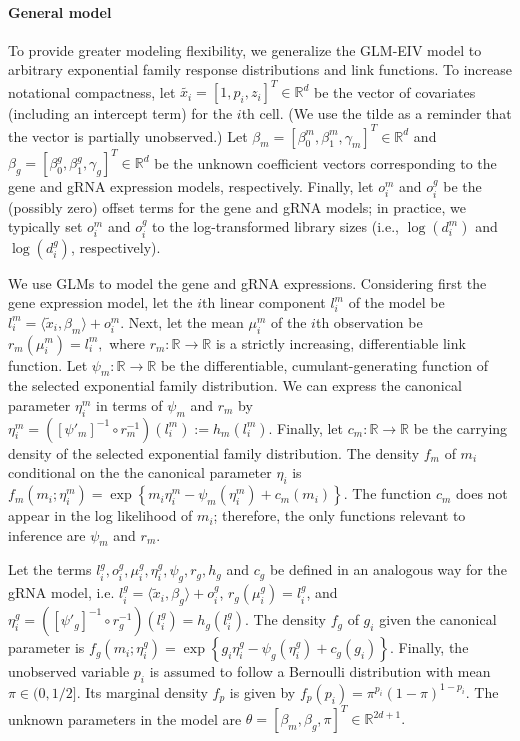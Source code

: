 \documentclass[12pt]{article}
\begin{document}
\paragraph{General model} To provide greater modeling flexibility, we generalize the GLM-EIV model to arbitrary exponential family response distributions and link functions. To increase notational compactness, let $\tilde{x_i} = [1, p_i, z_i]^T \in \mathbb{R}^d$ be the vector of covariates (including an intercept term) for the $i$th cell. (We use the tilde as a reminder that the vector is partially unobserved.) Let $\beta_m = [\beta^m_0, \beta^m_1, \gamma_m]^T \in \mathbb{R}^d$ and $\beta_g = [\beta^g_0, \beta^g_1, \gamma_g]^T \in \mathbb{R}^d$ be the unknown coefficient vectors corresponding to the gene and gRNA expression models, respectively. Finally, let $o^m_i$ and $o^g_i$ be the (possibly zero) offset terms for the gene and gRNA models; in practice, we typically set $o^m_i$ and $o^g_i$ to the log-transformed library sizes (i.e., $\log(d^m_i)$ and $\log(d^g_i)$, respectively).

We use GLMs to model the gene and gRNA expressions. Considering first the gene expression model, let the $i$th linear component $l^m_i$ of the model be $l^m_i = \langle \tilde{x}_i, \beta_m \rangle + o^m_i.$ Next, let the mean $\mu^m_i$ of the $i$th observation be $r_m(\mu^m_i) = l^m_i,$ where $r_m:\mathbb{R} \to \mathbb{R}$ is a strictly increasing, differentiable link function. Let $\psi_m: \mathbb{R} \to \mathbb{R}$ be the differentiable, cumulant-generating function of the selected exponential family distribution. We can express the canonical parameter $\eta^m_i$ in terms of $\psi_m$ and $r_m$ by
$\eta^m_i = \left([\psi'_m]^{-1} \circ r^{-1}_m\right)(l_i^m) := h_m(l_i^m).$ Finally, let $c_m: \mathbb{R} \to \mathbb{R}$ be the carrying density of the selected exponential family distribution. The density $f_m$ of $m_i$ conditional on the the canonical parameter $\eta_i$ is
$f_m(m_i; \eta^m_i) = \exp\left\{m_i \eta^m_i - \psi_m(\eta^m_i) + c_m(m_i) \right\}.$ The function $c_m$ does not appear in the log likelihood of $m_i$; therefore, the only functions relevant to inference are $\psi_m$ and $r_m$.

Let the terms $l^g_i, o^g_i, \mu^g_i, \eta^g_i, \psi_g, r_g, h_g$ and $c_g$ be defined in an analogous way for the gRNA model, i.e. $l^g_i = \langle \tilde{x}_i, \beta_g \rangle + o^g_i$, $r_g(\mu^g_i) = l^g_i$, and $\eta^g_i = \left([\psi'_g]^{-1} \circ r^{-1}_g\right)(l_i^g) = h_g(l_i^g).$ The density $f_g$ of $g_i$ given the canonical parameter is $f_g(m_i; \eta^g_i) = \exp\left\{g_i \eta^g_i - \psi_g(\eta^g_i) + c_g(g_i)\right\}.$
Finally, the unobserved variable $p_i$ is assumed to follow a Bernoulli distribution with mean $\pi \in (0, 1/2]$. Its marginal density $f_p$ is given by $f_p(p_i) = \pi^{p_i}(1-\pi)^{1 - p_i}.$
The unknown parameters in the model are
$\theta = [\beta_m, \beta_g, \pi]^{T}  \in \mathbb{R}^{2d + 1}.$
\end{document}

